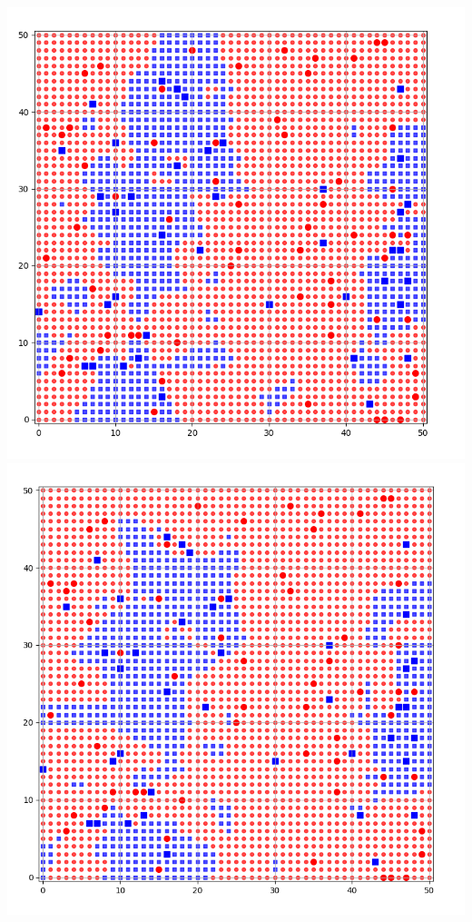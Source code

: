 \documentclass[10pt,class=report,crop=false]{standalone}
\begin{document}
\begin{activite}
\begin{enumerate}
\begin{enumerate}
\begin{center}
	\includegraphics[scale=\myscale,scale=0.133]{ecran-voisins-9c}
	\includegraphics[scale=\myscale,scale=0.13]{ecran-voisins-9d}	
\end{center}		 
		
		
	\end{enumerate}
		
\end{enumerate}
	
\end{activite}
\end{document}
